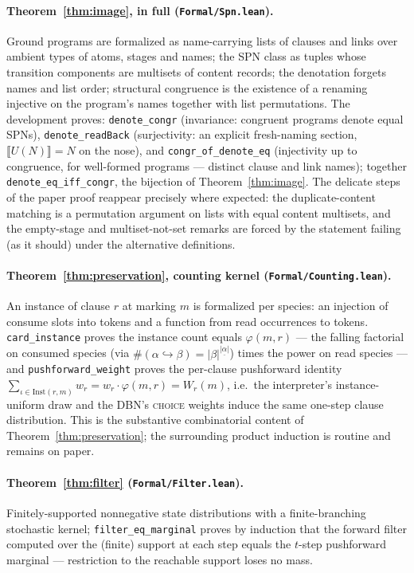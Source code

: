 \documentclass[11pt]{article}
\newcommand{\sem}[1]{\llbracket #1 \rrbracket}
\newcommand{\ff}[2]{#1^{\underline{#2}}}          %
\theoremstyle{plain}
\theoremstyle{definition}
\theoremstyle{remark}
\begin{document}
\paragraph{Theorem~\ref{thm:image}, in full
(\texttt{Formal/Spn.lean}).} Ground programs are formalized as
name-carrying lists of clauses and links over ambient types of atoms,
stages and names; the SPN class as tuples whose transition components
are multisets of content records; the denotation forgets names and list
order; structural congruence is the existence of a renaming injective
on the program's names together with list permutations. The
development proves: \texttt{denote\_congr} (invariance: congruent
programs denote equal SPNs), \texttt{denote\_readBack} (surjectivity:
an explicit fresh-naming section, $\sem{U(N)} = N$ on the nose), and
\texttt{congr\_of\_denote\_eq} (injectivity up to congruence, for
well-formed programs --- distinct clause and link names); together
\texttt{denote\_eq\_iff\_congr}, the bijection of
Theorem~\ref{thm:image}. The delicate steps of the paper proof
reappear precisely where expected: the duplicate-content matching is a
permutation argument on lists with equal content multisets, and the
empty-stage and multiset-not-set remarks are forced by the statement
failing (as it should) under the alternative definitions.

\paragraph{Theorem~\ref{thm:preservation}, counting kernel
(\texttt{Formal/Counting.lean}).} An instance of clause $r$ at marking
$m$ is formalized per species: an injection of consume slots into
tokens and a function from read occurrences to tokens.
\texttt{card\_instance} proves the instance count equals
$\varphi(m,r)$ --- the falling factorial on consumed species (via
$\#(\alpha \hookrightarrow \beta) = \ff{|\beta|}{|\alpha|}$) times the
power on read species --- and \texttt{pushforward\_weight} proves the
per-clause pushforward identity $\sum_{\iota \in \mathrm{Inst}(r,m)}
w_r = w_r \cdot \varphi(m,r) = W_r(m)$, i.e.\ the interpreter's
instance-uniform draw and the DBN's \textsc{choice} weights induce the
same one-step clause distribution. This is the substantive combinatorial
content of Theorem~\ref{thm:preservation}; the surrounding product
induction is routine and remains on paper.

\paragraph{Theorem~\ref{thm:filter}
(\texttt{Formal/Filter.lean}).} Finitely-supported nonnegative
state distributions with a finite-branching stochastic kernel;
\texttt{filter\_eq\_marginal} proves by induction that the forward
filter computed over the (finite) support at each step equals the
$t$-step pushforward marginal --- restriction to the reachable support
loses no mass.
\end{document}

